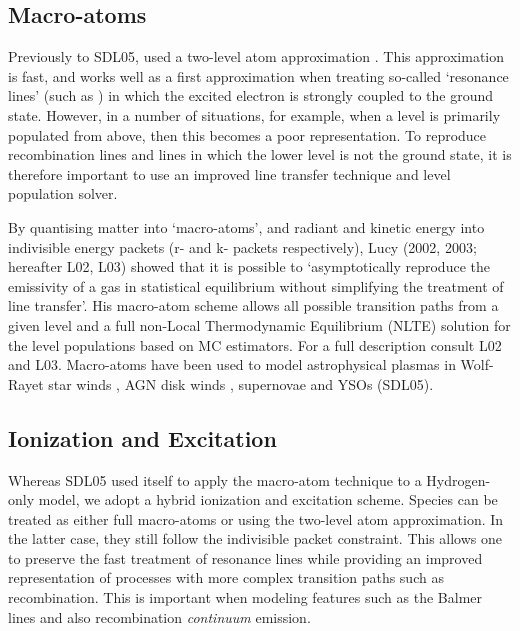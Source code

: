 \documentclass[preprint, a4paper, 11pt]{aastex}
\begin{document}
\subsection{Macro-atoms}

Previously to SDL05, \py used a two-level atom approximation \cite[see e.g.][]{mihalas}. This approximation is 
fast, and works well as a first approximation when treating so-called `resonance lines' (such as \civfull) 
in which the excited electron is strongly coupled to the ground state.
However, in a number of situations, for example, when a level is primarily populated from above, then
this becomes a poor representation. 
To reproduce recombination lines and lines in which the lower level is not the ground state, 
it is therefore important to use an improved line transfer technique and level population solver.

By quantising matter into `macro-atoms', and radiant and kinetic 
energy into indivisible energy packets (r- and k- packets respectively), 
Lucy (2002, 2003\nocite{lucy2002, lucy2003}; hereafter L02, L03) showed that it is possible 
to `asymptotically reproduce the emissivity of a gas in statistical equilibrium 
without simplifying the treatment of line transfer'. 
His macro-atom scheme allows all possible transition paths from a given level and a full non-Local 
Thermodynamic Equilibrium (NLTE) solution for the level populations based on MC estimators. 
For a full description consult L02 and L03. 
Macro-atoms have been used to model astrophysical plasmas in 
Wolf-Rayet star winds \citep{sim2004}, AGN disk winds \citep{simlong2008, tatum2012},
supernovae \citep{kasen2006, kerzendorfsim} and YSOs (SDL05).


\subsection{Ionization and Excitation}

Whereas SDL05 used \py itself to apply the macro-atom 
technique to a Hydrogen-only model, we
adopt a hybrid ionization and excitation scheme. 
Species can be treated as either full macro-atoms
or using the two-level atom approximation.
In the latter case, they still follow the indivisible packet constraint.
This allows one to preserve the fast treatment of resonance lines while providing 
an improved representation of processes with more complex
transition paths such as recombination. This is important when modeling features 
such as the Balmer lines and also recombination {\sl continuum} emission. 
\end{document}
